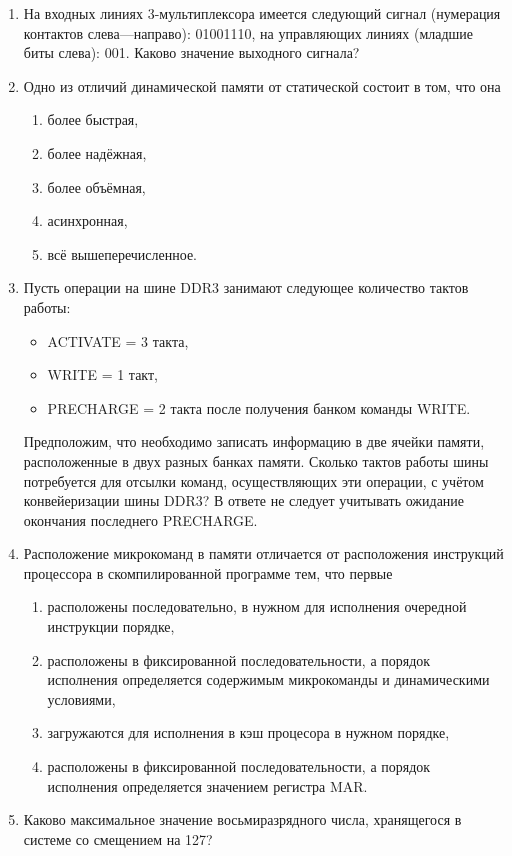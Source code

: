 \begin{enumerate}
	\item На входных линиях 3-мультиплексора имеется следующий сигнал (нумерация контактов слева—направо): 01001110, на управляющих линиях (младшие биты слева): 001. Каково значение выходного сигнала?

	\item Одно из отличий динамической памяти от статической состоит в том, что она
	\begin{enumerate}
		\item более быстрая,
		\item более надёжная,
		\item более объёмная,
		\item асинхронная,
		\item всё вышеперечисленное.
	\end{enumerate}

	\item Пусть операции на шине DDR3 занимают следующее количество тактов работы:
	\begin{itemize}
		\item ACTIVATE = 3 такта,
		\item WRITE = 1 такт,
		\item PRECHARGE = 2 такта после получения банком команды WRITE.
	\end{itemize}
	Предположим, что необходимо записать информацию в две ячейки памяти, расположенные в двух разных банках памяти. Сколько тактов работы шины потребуется для отсылки команд, осуществляющих эти операции, с учётом конвейеризации шины DDR3? В ответе не следует учитывать ожидание окончания последнего PRECHARGE.

	\item Расположение микрокоманд в памяти отличается от расположения инструкций процессора в скомпилированной программе тем, что первые
	\begin{enumerate}
		\item расположены последовательно, в нужном для исполнения очередной инструкции порядке,
		\item расположены в фиксированной последовательности, а порядок исполнения определяется содержимым микрокоманды и динамическими условиями,
		\item загружаются для исполнения в кэш процесора в нужном порядке,
		\item расположены в фиксированной последовательности, а порядок исполнения определяется значением регистра MAR.
	\end{enumerate}

	\item Каково максимальное значение восьмиразрядного числа, хранящегося в системе со смещением на 127?
\end{enumerate}

